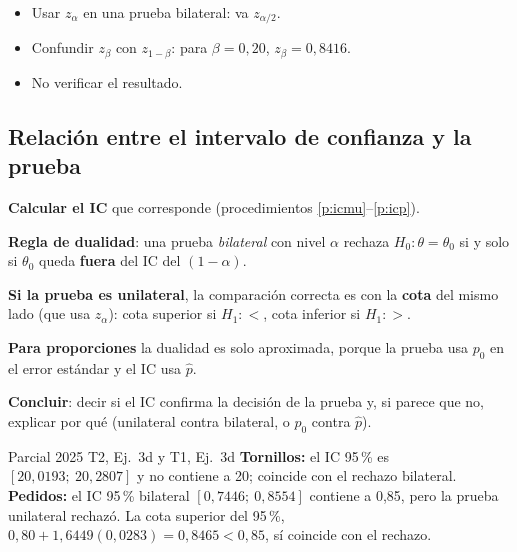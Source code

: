 \begin{ojo}
\begin{itemize}
\item Usar $z_\alpha$ en una prueba bilateral: va $z_{\alpha/2}$.
\item Confundir $z_\beta$ con $z_{1-\beta}$: para $\beta=0{,}20$, $z_\beta=0{,}8416$.
\item No verificar el resultado.
\end{itemize}
\end{ojo}

\subsection{Relación entre el intervalo de confianza y la prueba}\label{p:dual}
\begin{pasos}
\begin{pasolista}
\item \textbf{Calcular el IC} que corresponde (procedimientos \ref{p:icmu}--\ref{p:icp}).
\item \textbf{Regla de dualidad}: una prueba \emph{bilateral} con nivel $\alpha$ rechaza $H_0:\theta=\theta_0$ si y solo si $\theta_0$ queda \textbf{fuera} del IC del $(1-\alpha)$.
\item \textbf{Si la prueba es unilateral}, la comparación correcta es con la \textbf{cota} del mismo lado (que usa $z_\alpha$): cota superior si $H_1:<$, cota inferior si $H_1:>$.
\item \textbf{Para proporciones} la dualidad es solo aproximada, porque la prueba usa $p_0$ en el error estándar y el IC usa $\hat p$.
\item \textbf{Concluir}: decir si el IC confirma la decisión de la prueba y, si parece que no, explicar por qué (unilateral contra bilateral, o $p_0$ contra $\hat p$).
\end{pasolista}
\end{pasos}
\begin{modelo}{Parcial 2025 T2, Ej.\ 3d y T1, Ej.\ 3d}
\textbf{Tornillos:} el IC 95\,\% es $[20{,}0193;\ 20{,}2807]$ y no contiene a 20; coincide con el rechazo bilateral.
\textbf{Pedidos:} el IC 95\,\% bilateral $[0{,}7446;\ 0{,}8554]$ contiene a 0,85, pero la prueba unilateral rechazó. La cota superior del 95\,\%, $0{,}80+1{,}6449(0{,}0283)=0{,}8465<0{,}85$, sí coincide con el rechazo.
\end{modelo}
